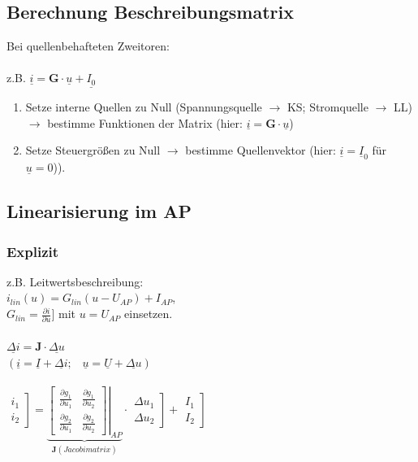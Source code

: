 \documentclass[a4paper,twocolumn,10pt]{article}
\begin{document}
\subsection*{Berechnung Beschreibungsmatrix}
Bei quellenbehafteten Zweitoren:\\\\
z.B. $\underline{i}=\textbf{G}\cdot \underline{u}+\underline{I_0}$
\begin{enumerate}
	\item Setze interne Quellen zu Null (Spannungsquelle $\rightarrow$ KS; Stromquelle $\rightarrow$ LL) $\rightarrow$ bestimme Funktionen der Matrix (hier: $\underline{i}=\textbf{G}\cdot \underline{u}$)
	\item Setze Steuergrößen zu Null $\rightarrow$ bestimme Quellenvektor (hier: $\underline{i}=\underline{I}_0$ für $\underline{u}=0$)).
\end{enumerate}

\subsection*{Linearisierung im AP}
\subsubsection*{Explizit}
z.B. Leitwertsbeschreibung:\\
$i_{lin}(u)=G_{lin}(u-U_{AP})+I_{AP}$,\\
$G_{lin}=\frac{\partial i}{\partial u}]$ mit $u=U_{AP}$ einsetzen.
\\\\
$\underline{\Delta i}=\textbf{J}\cdot \underline{\Delta u}$\\
$(\underline{i}=\underline{I}+\underline{\Delta i};\;\;\;\underline{u}=\underline{U}+\underline{\Delta u})$\\\\
$\left.\begin{matrix}i_1\\ i_2\end{matrix}\right]=\underbrace{\left.\begin{bmatrix}\frac{\partial g_1}{\partial u_1} & \frac{\partial g_1}{\partial u_2}\\ \frac{\partial g_2}{\partial u_1} & \frac{\partial g_2}{\partial u_2}\end{bmatrix}\right|_{AP}}_{\textbf{J} (Jacobimatrix)}\cdot \left.\begin{matrix}\Delta u_1\\ \Delta u_2\end{matrix}\right]+\left.\begin{matrix}I_1\\ I_2\end{matrix}\right]$
\end{document}

